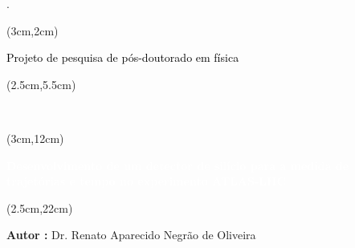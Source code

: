 \begin{titlepage}.
    

    \vspace{3.5cm}

    
    \begin{textblock*}{15cm}(3cm,2cm)
        \begin{Huge}
            \begin{center}
                \makeatletter
                \noindent\textcolor{black}{Projeto de pesquisa de pós-doutorado em física}
                \makeatother
            \end{center}
        \end{Huge}
    \end{textblock*}
    
    \begin{textblock*}{15cm}(2.5cm,5.5cm)
        \makeatletter
        \begin{LARGE}
            \begin{center}
                \color{black}
                {\it  }\\
            \end{center}
         \end{LARGE}
     
    \end{textblock*}
    
    \begin{textblock*}{15cm}(3cm,12cm)
        \begin{Huge}
            \begin{center}
                \makeatletter
                \noindent\textcolor{white}{\textbf{Desenvolvimento de um detector de silício para a medida de trajetórias e tempo no experimento ATLAS-LHC}}
                \makeatother
            \end{center}
        \end{Huge}
    \end{textblock*}

    \begin{textblock*}{15cm}(2.5cm,22cm)
        \begin{LARGE}
        \begin{center}
            \color{black}
                \textbf{Autor :} Dr. Renato Aparecido Negrão de Oliveira \\  \\ 
        \end{center}
            

\end{LARGE}
\end{textblock*}
\end{titlepage}
